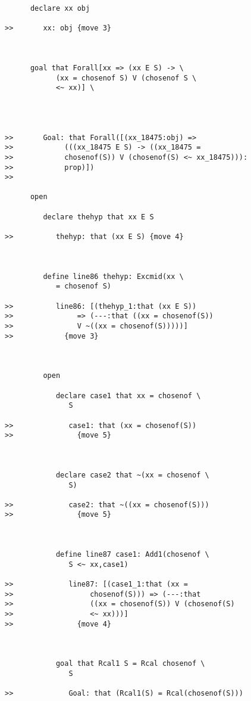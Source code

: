 \documentclass[12pt]{article}
\begin{document}
\begin{verbatim}
      declare xx obj

>>       xx: obj {move 3}



      goal that Forall[xx => (xx E S) -> \
            (xx = chosenof S) V (chosenof S \
            <~ xx)] \
         



>>       Goal: that Forall([(xx_18475:obj) =>
>>            (((xx_18475 E S) -> ((xx_18475 =
>>            chosenof(S)) V (chosenof(S) <~ xx_18475))):
>>            prop)])
>>         

      open

         declare thehyp that xx E S

>>          thehyp: that (xx E S) {move 4}



         define line86 thehyp: Excmid(xx \
            = chosenof S)

>>          line86: [(thehyp_1:that (xx E S))
>>               => (---:that ((xx = chosenof(S))
>>               V ~((xx = chosenof(S)))))]
>>            {move 3}



         open

            declare case1 that xx = chosenof \
               S

>>             case1: that (xx = chosenof(S))
>>               {move 5}



            declare case2 that ~(xx = chosenof \
               S)

>>             case2: that ~((xx = chosenof(S)))
>>               {move 5}



            define line87 case1: Add1(chosenof \
               S <~ xx,case1)

>>             line87: [(case1_1:that (xx =
>>                  chosenof(S))) => (---:that
>>                  ((xx = chosenof(S)) V (chosenof(S)
>>                  <~ xx)))]
>>               {move 4}



            goal that Rcal1 S = Rcal chosenof \
               S

>>             Goal: that (Rcal1(S) = Rcal(chosenof(S)))

\end{verbatim}
\end{document}
